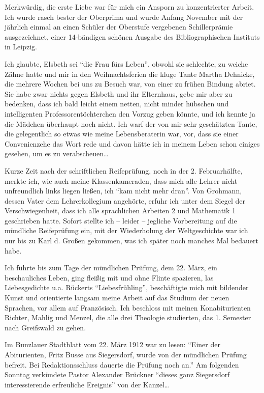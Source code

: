 Merkwürdig, die erste Liebe war für mich ein Ansporn zu konzentrierter Arbeit. Ich wurde rasch bester der Oberprima und wurde Anfang November mit der jährlich einmal an einen Schüler der Oberstufe vergebenen Schillerprämie ausgezeichnet, einer 14-bändigen schönen Ausgabe des Bibliographischen Instituts in Leipzig.

Ich glaubte, Elsbeth sei \enquote{die Frau fürs Leben}, obwohl sie schlechte, zu weiche Zähne hatte und mir in den Weihnachtsferien die kluge Tante Martha Dehnicke, die mehrere Wochen bei uns zu Besuch war, von einer zu frühen Bindung abriet. Sie habe zwar nichts gegen Elsbeth und ihr Elternhaus, gebe mir aber zu bedenken, dass ich bald leicht einem netten, nicht minder hübschen und intelligenten Professorentöchterchen den Vorzug geben könnte, und ich kennte ja die Mädchen überhaupt noch nicht. Ich warf der von mir sehr geschätzten Tante, die gelegentlich so etwas wie meine Lebensberaterin war, vor, dass sie einer Convenienzehe das Wort rede und davon hätte ich in meinem Leben schon einiges gesehen, um es zu verabscheuen\dots

Kurze Zeit nach der schriftlichen Reifeprüfung, noch in der 2. Februarhälfte, merkte ich, wie auch meine Klassenkameraden, dass mich alle Lehrer nicht unfreundlich links liegen ließen, ich \enquote{kam nicht mehr dran}. Von Grohmann, dessen Vater dem Lehrerkollegium angehörte, erfuhr ich unter dem Siegel der Verschwiegenheit, dass ich alle sprachlichen Arbeiten 2 und Mathematik 1 geschrieben hatte. Sofort stellte ich -- leider -- jegliche Vorbereitung auf die mündliche Reifeprüfung ein, mit der Wiederholung der Weltgeschichte war ich nur bis zu Karl d. Großen gekommen, was ich später noch manches Mal bedauert habe.

Ich führte bis zum Tage der mündlichen Prüfung, dem 22. März, ein beschauliches Leben, ging fleißig mit und ohne Flinte spazieren, las Liebesgedichte u.a. Rückerts \enquote{Liebesfrühling}, beschäftigte mich mit bildender Kunst und orientierte langsam meine Arbeit auf das Studium der neuen Sprachen, vor allem auf Französisch. Ich beschloss mit meinen Konabiturienten Richter, Mahlig und Menzel, die alle drei Theologie studierten, das 1. Semester nach Greifswald zu gehen.

Im Bunzlauer Stadtblatt vom 22. März 1912 war zu lesen: \enquote{Einer der Abiturienten, Fritz Busse aus Siegersdorf, wurde von der mündlichen Prüfung befreit. Bei Redaktionsschluss dauerte die Prüfung noch an.} Am folgenden Sonntag verkündete Pastor Alexander Brückner \enquote{dieses ganz Siegersdorf interessierende erfreuliche Ereignis} von der Kanzel\dots

